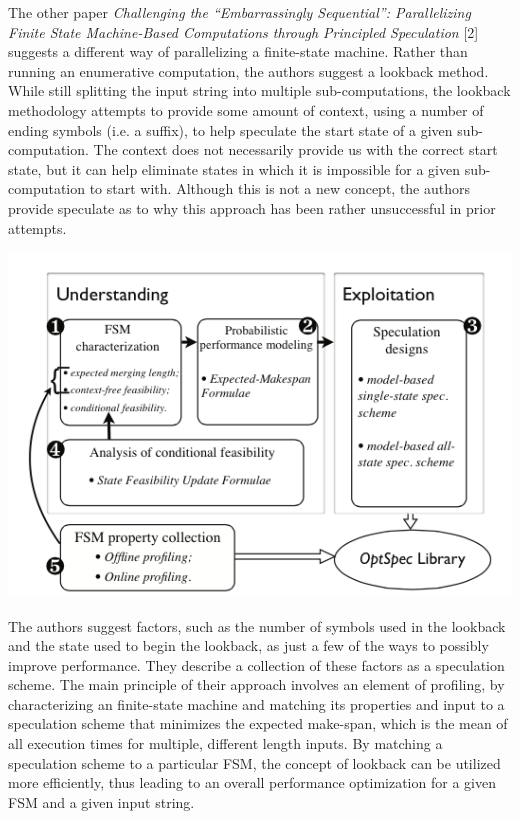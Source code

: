 \documentclass[11pt]{sigplanconf}
\begin{document}
The other paper \textit{Challenging the ``Embarrassingly Sequential'': Parallelizing Finite State Machine-Based Computations through Principled Speculation} [2] suggests a different way of parallelizing a finite-state machine. Rather than running an enumerative computation, the authors suggest a lookback method. While still splitting the input string into multiple sub-computations, the lookback methodology attempts to provide some amount of context, using a number of ending symbols (i.e. a suffix), to help speculate the start state of a given sub-computation. The context does not necessarily provide us with the correct start state, but it can help eliminate states in which it is impossible for a given sub-computation to start with. Although this is not a new concept, the authors provide speculate as to why this approach has been rather unsuccessful in prior attempts.

\includegraphics[width=\linewidth]{lookback_profiling_overview.png}

The authors suggest factors, such as the number of symbols used in the lookback and the state used to begin the lookback, as just a few of the ways to possibly improve performance. They describe a collection of these factors as a speculation scheme. The main principle of their approach involves an element of profiling, by characterizing an finite-state machine and matching its properties and input to a speculation scheme that minimizes the expected make-span, which is the mean of all execution times for multiple, different length inputs. By matching a speculation scheme to a particular FSM, the concept of lookback can be utilized more efficiently, thus leading to an overall performance optimization for a given FSM and a given input string.
\end{document}
